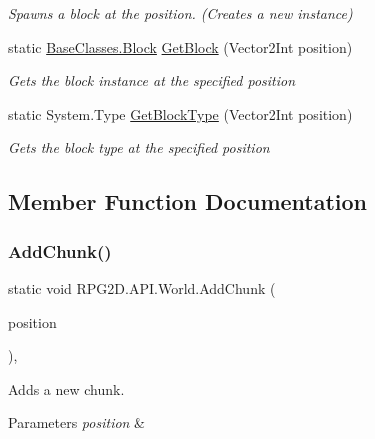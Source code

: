 \begin{DoxyCompactItemize}
\begin{DoxyCompactList}\small\item\em Spawns a block at the position. (Creates a new instance) \end{DoxyCompactList}\item 
static \mbox{\hyperlink{class_r_p_g2_d_1_1_base_classes_1_1_block}{Base\+Classes.\+Block}} \mbox{\hyperlink{class_r_p_g2_d_1_1_a_p_i_1_1_world_ab5146954658368ff3402fa08f9a556e7}{Get\+Block}} (Vector2\+Int position)
\begin{DoxyCompactList}\small\item\em Gets the block instance at the specified position \end{DoxyCompactList}\item 
static System.\+Type \mbox{\hyperlink{class_r_p_g2_d_1_1_a_p_i_1_1_world_a2e698d1e8265a1040e7713d40aeefb69}{Get\+Block\+Type}} (Vector2\+Int position)
\begin{DoxyCompactList}\small\item\em Gets the block type at the specified position \end{DoxyCompactList}\end{DoxyCompactItemize}


\subsection{Member Function Documentation}
\mbox{\label{class_r_p_g2_d_1_1_a_p_i_1_1_world_a487e129cc74d77b2e003d197bb50a2a8}} 
\subsubsection{\texorpdfstring{Add\+Chunk()}{AddChunk()}}
{\footnotesize\ttfamily static void R\+P\+G2\+D.\+A\+P\+I.\+World.\+Add\+Chunk (\begin{DoxyParamCaption}\item[{Vector2\+Int}]{position }\end{DoxyParamCaption})\hspace{0.3cm}{\ttfamily [inline]}, {\ttfamily [static]}}



Adds a new chunk. 


\begin{DoxyParams}{Parameters}
{\em position} & \\
\hline
\end{DoxyParams}
\mbox{\label{class_r_p_g2_d_1_1_a_p_i_1_1_world_ab5146954658368ff3402fa08f9a556e7}} 
